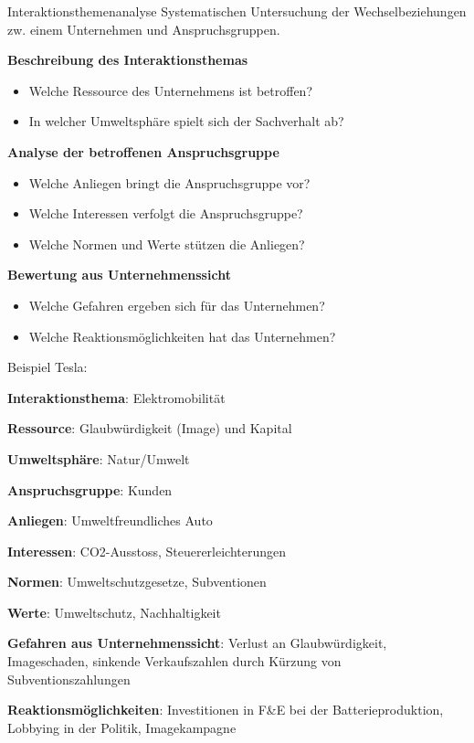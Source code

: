 \begin{minipage}{0.5\linewidth}
\begin{KR}{Interaktionsthemenanalyse}
Systematischen Untersuchung der Wechselbeziehungen zw. einem Unternehmen und Anspruchsgruppen.

\textbf{Beschreibung des Interaktionsthemas}
    \begin{itemize}
        \item Welche Ressource des Unternehmens ist betroffen?
        \item In welcher Umweltsphäre spielt sich der Sachverhalt ab?
    \end{itemize}
\textbf{Analyse der betroffenen Anspruchsgruppe}
    \begin{itemize}
        \item Welche Anliegen bringt die Anspruchsgruppe vor?
        \item Welche Interessen verfolgt die Anspruchsgruppe?
        \item Welche Normen und Werte stützen die Anliegen?
    \end{itemize}
\textbf{Bewertung aus Unternehmenssicht}
    \begin{itemize}
        \item Welche Gefahren ergeben sich für das Unternehmen?
        \item Welche Reaktionsmöglichkeiten hat das Unternehmen?
    \end{itemize}
\end{KR}
\end{minipage}
\begin{minipage}{0.5\linewidth}
\begin{example}
Beispiel Tesla:

\textbf{Interaktionsthema}: Elektromobilität

\textbf{Ressource}: Glaubwürdigkeit (Image) und Kapital

\textbf{Umweltsphäre}: Natur/Umwelt

\textbf{Anspruchsgruppe}: Kunden

\textbf{Anliegen}: Umweltfreundliches Auto

\textbf{Interessen}: CO2-Ausstoss, Steuererleichterungen

\textbf{Normen}: Umweltschutzgesetze, Subventionen

\textbf{Werte}: Umweltschutz, Nachhaltigkeit

\textbf{Gefahren aus Unternehmenssicht}: Verlust an Glaubwürdigkeit, Imageschaden, sinkende Verkaufszahlen durch Kürzung von Subventionszahlungen

\textbf{Reaktionsmöglichkeiten}: Investitionen in F\&E bei der Batterieproduktion, Lobbying in der Politik, Imagekampagne
\end{example}
\end{minipage}

